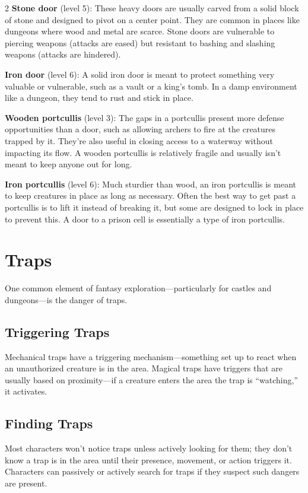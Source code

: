 \begin{multicols}{2}
\textbf{Stone door} (level 5): These heavy doors are usually carved from a solid block of stone and designed to pivot on a center point. They are common in places like dungeons where wood and metal are scarce. Stone doors are vulnerable to piercing weapons (attacks are eased) but resistant to bashing and slashing weapons (attacks are hindered). 

\textbf{Iron door} (level 6): A solid iron door is meant to protect something very valuable or vulnerable, such as a vault or a king’s tomb. In a damp environment like a dungeon, they tend to rust and stick in place. 

\textbf{Wooden portcullis} (level 3): The gaps in a portcullis present more defense opportunities than a door, such as allowing archers to fire at the creatures trapped by it. They’re also useful in closing access to a waterway without impacting its flow. A wooden portcullis is relatively fragile and usually isn’t meant to keep anyone out for long. 

\textbf{Iron portcullis} (level 6): Much sturdier than wood, an iron portcullis is meant to keep creatures in place as long as necessary. Often the best way to get past a portcullis is to lift it instead of breaking it, but some are designed to lock in place to prevent this. A door to a prison cell is essentially a type of iron portcullis.

\section{Traps}

One common element of fantasy exploration—particularly for castles and dungeons—is the danger of traps.

\subsection{Triggering Traps}

Mechanical traps have a triggering mechanism—something set up to react when an unauthorized creature is in the area. Magical traps have triggers that are usually based on proximity—if a creature enters the area the trap is “watching,” it activates.

\subsection{Finding Traps}

Most characters won’t notice traps unless actively looking for them; they don’t know a trap is in the area until their presence, movement, or action triggers it. Characters can passively or actively search for traps if they suspect such dangers are present. 


\end{multicols}

